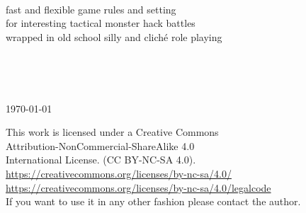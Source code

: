 \documentclass[11pt, twoside, titlepage, a4paper]{report}
\newcommand{\vsmall}{\footnotesize}  %
\begin{document}
\begin{titlepage}
\begin{center}
   \vspace{2 cm} %


   \ %

   \large{
       fast and flexible game rules and setting\\
       for interesting tactical monster hack battles\\
       wrapped in old school silly and cliché role playing
   }



   \vfill %


   \ %



   \ %

   \normalsize{\today}

\end{center}


\end{titlepage}




\clearpage
\thispagestyle{empty}
\raggedbottom

\vsmall
\noindent 
This work is licensed under a Creative Commons \\
Attribution-NonCommercial-ShareAlike 4.0 \\
International License. (CC BY-NC-SA 4.0).\\
\url{https://creativecommons.org/licenses/by-nc-sa/4.0/} \\
\url{https://creativecommons.org/licenses/by-nc-sa/4.0/legalcode} \\
If you want to use it in any other fashion please contact the author.

\

\end{document}
